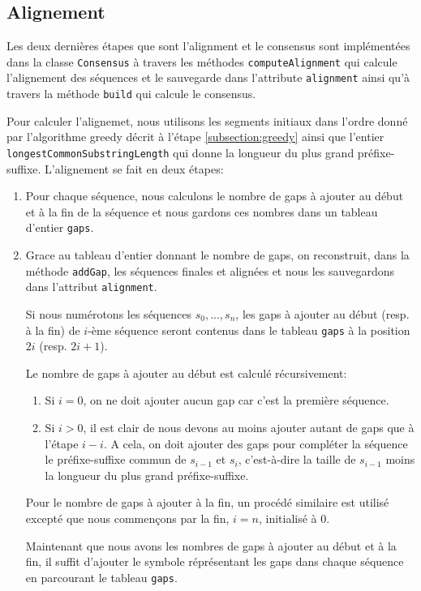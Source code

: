 \subsection{Alignement}
\label{subsection:alignment}
Les deux dernières étapes que sont l'alignment et le consensus sont 
implémentées dans la classe \verb|Consensus| à travers les méthodes 
\verb|computeAlignment| qui calcule l'alignement des séquences et le sauvegarde 
dans l'attribute \verb|alignment| ainsi qu'à travers la méthode \verb|build| 
qui calcule le consensus.

Pour calculer l'alignemet, nous utilisons les segments initiaux dans l'ordre 
donné par l'algorithme greedy décrit à l'étape \ref{subsection:greedy} ainsi 
que l'entier \verb|longestCommonSubstringLength| qui donne la longueur du plus 
grand préfixe-suffixe.
L'alignement se fait en deux étapes:
\begin{enumerate}
  \item Pour chaque séquence, nous calculons le nombre de gaps à ajouter au 
début et à la fin de la séquence et nous gardons ces nombres dans un tableau 
d'entier \verb|gaps|.
  \item Grace au tableau d'entier donnant le nombre de gaps, on reconstruit,
dans la méthode \verb|addGap|, les séquences finales et alignées et nous les 
sauvegardons dans l'attribut \verb|alignment|.

Si nous numérotons les séquences $s_{0}, ..., s_{n}$, les gaps à ajouter au 
début (resp. à la fin) de $i$-ème séquence seront contenus dans le tableau 
\verb|gaps| à la position $2i$ (resp. $2i + 1$).

Le nombre de gaps à ajouter au début est calculé récursivement:
\begin{enumerate}
 \item Si $i = 0$, on ne doit ajouter aucun gap car c'est la première séquence.
 \item Si $i > 0$, il est clair de nous devons au moins ajouter autant 
de gaps que à l'étape $i - i$. A cela, on doit ajouter des gaps pour compléter 
la séquence le préfixe-suffixe commun de $s_{i - 1}$ et $s_{i}$, 
c'est-à-dire la taille de $s_{i - 1}$ moins la longueur du plus 
grand préfixe-suffixe.
\end{enumerate}

Pour le nombre de gaps à ajouter à la fin, un procédé similaire est utilisé 
excepté que nous commençons par la fin, $i = n$, initialisé à $0$.

Maintenant que nous avons les nombres de gaps à ajouter au début et à la fin, 
il suffit d'ajouter le symbole réprésentant les gaps dans chaque séquence en 
parcourant le tableau \verb|gaps|.
\end{enumerate}

